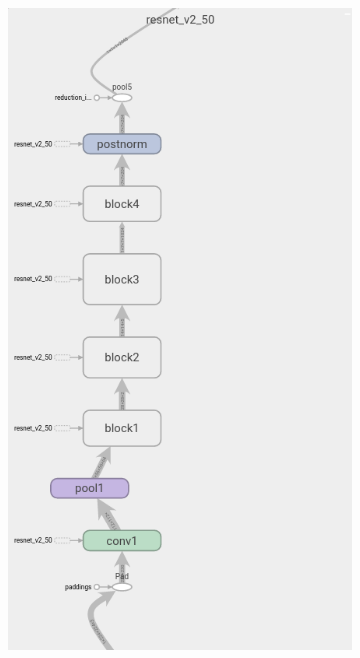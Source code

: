 \begin{figure}[H]
	\begin{subfigure}[h]{0.45\textwidth}
		\centering
		\includegraphics[width=\textwidth]{images/chapter3/resnet_v2_50.png}
	\end{subfigure} 
	\hfill
	\begin{subfigure}[h]{0.45\textwidth}

\end{subfigure}
\end{figure}
